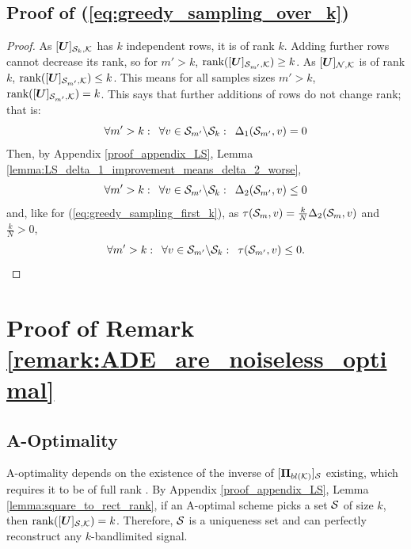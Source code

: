 \subsection{Proof of (\ref{eq:greedy_sampling_over_k})}
\begin{proof}
    
As $[\bm{U}]_{\mathcal{S}_{k},\mathcal{K}}$ has $k$ independent rows, it is of rank $k$. Adding further rows cannot decrease its rank, so for $m' > k$, $\textrm{rank}( [\bm{U}]_{\mathcal{S}_{m'},\mathcal{K}}) \geq k$. As $\matrsubU{N}$ is of rank $k$, $\textrm{rank}([\bm{U}]_{\mathcal{S}_{m'},\mathcal{K}}) \leq k$. This means for all samples sizes $m' > k$, $\textrm{rank}([\bm{U}]_{\mathcal{S}_{m'},\mathcal{K}}) = k$. This says that further additions of rows do not change rank; that is:
\begin{equation} 
   \forall m' > k: \enskip \forall v \in \mathcal{S}_{m'} \backslash \mathcal{S}_{k}: \enskip \Delta_{1}(\mathcal{S}_{m'},v) = 0
\end{equation}
Then, by Appendix \ref{proof_appendix_LS}, Lemma \ref{lemma:LS_delta_1_improvement_means_delta_2_worse},
\begin{equation}
    \forall m' > k: \enskip \forall v \in \mathcal{S}_{m'} \backslash \mathcal{S}_{k}: \enskip \Delta_{2}(\mathcal{S}_{m'},v) \leq 0 
\end{equation}
and, like for (\ref{eq:greedy_sampling_first_k}), as $\tau(\mathcal{S}_{m},v) = \frac{k}{N}\Delta_{2}(\mathcal{S}_{m},v)$ and $\frac{k}{N} > 0$,
\begin{equation}
     \forall m' > k: \enskip \forall v \in \mathcal{S}_{m'}\backslash \mathcal{S}_{k} : \enskip \tau(\mathcal{S}_{m'},v) \leq 0. 
\end{equation}
\end{proof}


\section{Proof of Remark \ref{remark:ADE_are_noiseless_optimal}}
\label{app:proof_of_remark_ADE_are_noiseless_optimal}

\subsection*{A-Optimality}
A-optimality depends on the existence of the inverse of $\projbl[S]$  existing, which requires it to be of full rank . By Appendix \ref{proof_appendix_LS}, Lemma \ref{lemma:square_to_rect_rank}, if an A-optimal scheme picks a set $\mathcal{S}$ of size $k$, then $\text{rank}([\bm{U}]_{\mathcal{S},\mathcal{K}}) = k$. Therefore, $\mathcal{S}$ is a uniqueness set \cite{anis2016efficient} and can perfectly reconstruct any $k$-bandlimited signal.


